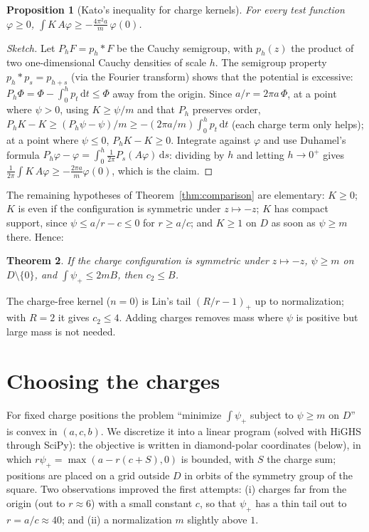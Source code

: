 \documentclass[11pt]{amsart}
\newtheorem{theorem}{Theorem}[section]
\newtheorem{proposition}[theorem]{Proposition}
\theoremstyle{definition}
\theoremstyle{remark}
\newcommand{\dd}{\,\mathrm{d}}
\begin{document}
\begin{proposition}[Kato's inequality for charge kernels]\label{prop:kato}
For every test function $\varphi \ge 0$,
$\int K\, A\varphi \ge -\frac{4\pi^2 a}{m}\, \varphi(0)$.
\end{proposition}

\begin{proof}[Sketch]
Let $P_h F = p_h * F$ be the Cauchy semigroup, with $p_h(z)$ the product of two one-dimensional
Cauchy densities of scale $h$. The semigroup property $p_h * p_s = p_{h+s}$ (via the Fourier
transform) shows that the potential is excessive:
$P_h \Phi = \Phi - \int_0^h p_t \dd t \le \Phi$ away from the origin. Since $a/r = 2\pi a\,\Phi$, at a point
where $\psi > 0$, using $K \ge \psi/m$ and that $P_h$ preserves order,
$P_h K - K \ge (P_h \psi - \psi)/m \ge -(2\pi a/m) \int_0^h p_t \dd t$ (each charge term only helps); at a
point where $\psi \le 0$, $P_h K - K \ge 0$. Integrate against $\varphi$ and use Duhamel's formula
$P_h\varphi - \varphi = \int_0^h \frac{1}{2\pi} P_s(A\varphi)\dd s$: dividing by $h$ and letting $h \to 0^+$
gives $\frac{1}{2\pi}\int K\,A\varphi \ge -\frac{2\pi a}{m}\varphi(0)$, which is the claim.
\end{proof}

The remaining hypotheses of Theorem~\ref{thm:comparison} are elementary: $K \ge 0$; $K$ is even if
the configuration is symmetric under $z \mapsto -z$; $K$ has compact support, since $\psi \le a/r - c
\le 0$ for $r \ge a/c$; and $K \ge 1$ on $D$ as soon as $\psi \ge m$ there. Hence:

\begin{theorem}\label{thm:charge}
If the charge configuration is symmetric under $z \mapsto -z$, $\psi \ge m$ on $D \setminus\{0\}$, and
$\int \psi_+ \le 2mB$, then $c_2 \le B$.
\end{theorem}

The charge-free kernel ($n=0$) is Lin's tail $(R/r - 1)_+$ up to normalization; with $R = 2$ it
gives $c_2 \le 4$. Adding charges removes mass where $\psi$ is positive but large mass is not needed.

\section{Choosing the charges}\label{sec:lp}

For fixed charge positions the problem ``minimize $\int\psi_+$ subject to $\psi \ge m$ on $D$'' is
convex in $(a, c, b)$. We discretize it into a linear program (solved with HiGHS through SciPy):
the objective is written in diamond-polar coordinates (below), in which $r\psi_+ =
\max(a - r(c + S), 0)$ is bounded, with $S$ the charge sum; positions are placed on a grid outside $D$
in orbits of the symmetry group of the square. Two observations improved the first attempts:
(i) charges far from the origin (out to $r \approx 6$) with a small constant $c$, so that
$\psi_+$ has a thin tail out to $r = a/c \approx 40$; and (ii) a normalization $m$ slightly above $1$.
\end{document}
